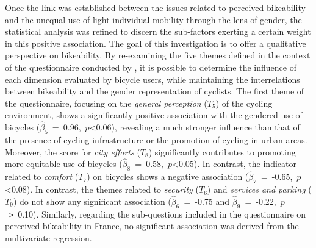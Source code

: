 \begin{refsegment}
Once the link was established between the issues related to perceived bikeability and the unequal use of light individual mobility through the lens of gender, the statistical analysis was refined to discern the sub-factors exerting a certain weight in this positive association. The goal of this investigation is to offer a qualitative perspective on bikeability. By re-examining the five themes defined in the context of the questionnaire conducted by \textcolor{blue}{\textcite{fub_barometre_2021}}, it is possible to determine the influence of each dimension evaluated by bicycle users, while maintaining the interrelations between bikeability and the gender representation of cyclists. The first theme of the questionnaire, focusing on the \textsl{general perception} (\(T_{5}\)) of the cycling environment, shows a significantly positive association with the gendered use of bicycles ($\hat{\beta}_{5}$~=~0.96,~$p$\textless0.06), revealing a much stronger influence than that of the presence of cycling infrastructure or the promotion of cycling in urban areas. Moreover, the score for \textsl{city efforts} (\(T_{8}\)) significantly contributes to promoting more equitable use of bicycles ($\hat{\beta}_{8}$~=~0.58,~$p$\textless0.05). In contrast, the indicator related to \textsl{comfort} (\(T_{7}\)) on bicycles shows a negative association ($\hat{\beta}_{7}$~=~-0.65,~$p$\textless0.08). In contrast, the themes related to \textsl{security} (\(T_{6}\)) and \textsl{services and parking} (\(T_{9}\)) do not show any significant association ($\hat{\beta}_{6}$~=~-0.75 and $\hat{\beta}_{9}$~=~-0.22,~$p$~\texttt{>}~0.10). Similarly, regarding the sub-questions included in the questionnaire on perceived bikeability in France, no significant association was derived from the multivariate regression.%


\end{refsegment}

